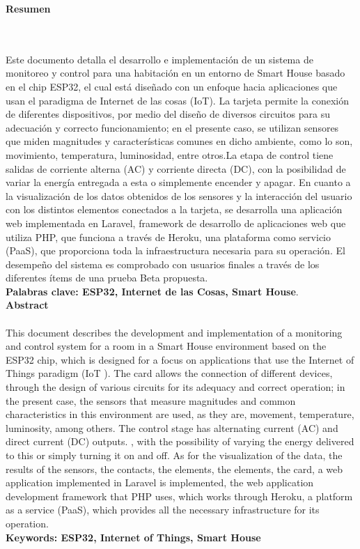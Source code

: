 \newpage
\thispagestyle{empty} \textbf{}\normalsize
\textbf{\LARGE Resumen}
\markboth{}{}
\\\\
 Este documento detalla el desarrollo e implementación de un sistema de monitoreo y control para una habitación en un entorno de Smart House basado en el chip ESP32, el cual está diseñado con un enfoque hacia aplicaciones que usan el paradigma de Internet de las cosas (IoT). La tarjeta permite la conexión de diferentes dispositivos, por medio del diseño de diversos circuitos para su adecuación y correcto funcionamiento; en el presente caso, se utilizan sensores que miden magnitudes y características comunes en dicho ambiente, como lo son, movimiento, temperatura, luminosidad, entre otros.La etapa de control tiene salidas de corriente alterna (AC) y corriente directa (DC), con la posibilidad de variar la energía entregada a esta o simplemente encender y apagar. En cuanto a la visualización de los datos obtenidos de los sensores y la interacción del usuario con los distintos elementos conectados a la tarjeta, se desarrolla una aplicación web implementada en Laravel, framework de desarrollo de aplicaciones web que utiliza PHP, que funciona a través de Heroku, una plataforma como servicio (PaaS), que proporciona toda la infraestructura necesaria para su operación. El desempeño del sistema es comprobado con usuarios finales a través de los diferentes ítems de una prueba Beta propuesta.\\
 
\textbf{\small Palabras clave: ESP32, Internet de las Cosas, Smart House}.\\[1.0cm]

\textbf{\LARGE Abstract}\\\\
This document describes the development and implementation of a monitoring and control system for a room in a Smart House environment based on the ESP32 chip, which is designed for a focus on applications that use the Internet of Things paradigm (IoT ). The card allows the connection of different devices, through the design of various circuits for its adequacy and correct operation; in the present case, the sensors that measure magnitudes and common characteristics in this environment are used, as they are, movement, temperature, luminosity, among others. The control stage has alternating current (AC) and direct current (DC) outputs. , with the possibility of varying the energy delivered to this or simply turning it on and off. As for the visualization of the data, the results of the sensors, the contacts, the elements, the elements, the card, a web application implemented in Laravel is implemented, the web application development framework that PHP uses, which works through Heroku, a platform as a service (PaaS), which provides all the necessary infrastructure for its operation.\\

\textbf{\small Keywords: ESP32, Internet of Things, Smart House}